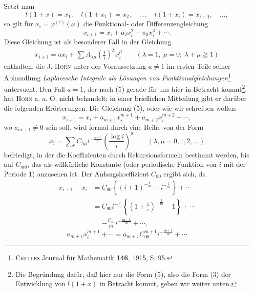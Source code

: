 Setzt man
\begin{equation}
l(1+x)=x_1,\quad l(1+x_1)=x_2,\quad\ldots,\quad l(1+x_i)=x_{i+1},\quad\ldots,\tag*{(4)}
\end{equation}
\noindent so gilt für \(x_i=\varphi^{(i)}(x)\) die Funktional- oder Differenzengleichung
\begin{equation}
x_{i+1}=x_i+a_2x_i^2+a_3x_i^3+\cdots.\tag*{(5)}
\end{equation}
\noindent Diese Gleichung ist als besonderer Fall in der Gleichung
\begin{equation}
\begin{gathered}
x_{i+1}=ax_i+\sum A_{\lambda\mu}\left(\frac1i\right)^\lambda x_i^\mu
\qquad(\lambda=1,\ \mu=0;\ \lambda+\mu\geqq1)
\end{gathered}\tag*{(6)}
\end{equation}
\noindent enthalten, die J. \textsc{Horn} unter der Voraussetzung \(a\ne1\) im ersten Teile seiner Abhandlung \textit{Laplacesche Integrale als Lösungen von Funktionalgleichungen}\footnote{\textsc{Crelles} Journal für Mathematik \textbf{146}, 1915, S. 95.} untersucht. Den Fall \(a=1\), der nach (5) gerade für uns hier in Betracht kommt\begingroup\renewcommand{\thefootnote}{**)}\footnote{Die Begründung dafür, daß hier nur die Form (5), also die Form (3) der Entwicklung von \(l(1+x)\) in Betracht kommt, geben wir weiter unten.}\endgroup, hat \textsc{Horn} a. a. O. nicht behandelt; in einer brieflichen Mitteilung gibt er darüber die folgenden Erörterungen. Die Gleichung (5), oder wie wir schreiben wollen:
\begin{equation}
x_{i+1}=x_i+a_{m+1}x_i^{m+1}+a_{m+2}x_i^{m+2}+\cdots,\tag*{(7)}
\end{equation}
\noindent wo \(a_{m+1}\ne0\) sein soll, wird formal durch eine Reihe von der Form
\begin{equation}
x_i=\sum C_{\lambda\mu}i^{-\frac{\lambda+1}{m}}\left(\frac{\log i}{i}\right)^\mu
\qquad(\lambda,\mu=0,1,2,\ldots)\tag*{(8)}
\end{equation}
\noindent befriedigt, in der die Koeffizienten durch Rekursionsformeln bestimmt werden, bis auf \(C_{m0}\), das als willkürliche Konstante (oder periodische Funktion von \(i\) mit der Periode 1) anzusehen ist. Der Anfangskoeffizient \(C_{00}\) ergibt sich, da
\[
\begin{aligned}
x_{i+1}-x_i&=C_{00}\left\{(i+1)^{-\frac1m}-i^{-\frac1m}\right\}+\cdots\\
&=C_{00}i^{-\frac1m}\left\{\left(1+\frac1i\right)^{-\frac1m}-1\right\}+\cdots\\
&=-\frac{C_{00}}m i^{-\frac{m+1}{m}}+\cdots,
\end{aligned}
\]
\[
a_{m+1}x_i^{m+1}+\cdots=a_{m+1}C_{00}^{m+1}i^{-\frac{m+1}{m}}+\cdots
\]
\par\endgroup

